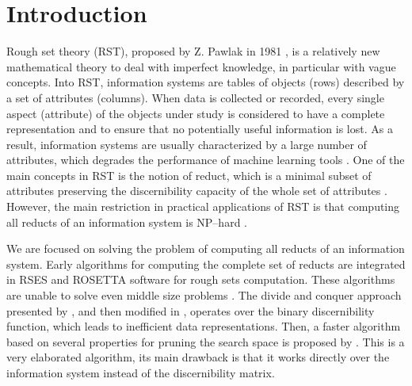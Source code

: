 \documentclass[authoryear,preprint,review,12pt]{elsarticle}
\begin{document}
\section{Introduction}
  Rough set theory (RST), proposed by Z. Pawlak in 1981 \citep{Pawlak81,Pawlak81-2,Pawlak82,Pawlak91}, 
  is a relatively new mathematical theory to deal with imperfect knowledge, in particular with vague 
  concepts. Into RST, information systems are tables of objects (rows) described by a set of attributes (columns). 
  When data is collected or recorded, every single aspect (attribute) of the objects under study is considered 
  to have a complete representation and to ensure that no potentially useful information is lost.
  As a result, information systems are usually characterized by a large number of attributes,
  which degrades the performance of machine learning tools \citep{Parthalain08}.
  One of the main concepts in RST is the notion of reduct, which is a minimal subset of attributes 
  preserving the discernibility capacity of the whole set of attributes \citep{Pawlak91}.  
  However, the main restriction in practical applications of RST is that computing all reducts of an 
  information system is NP--hard \citep{Skowron92}. 
  
  We are focused on solving the problem of computing all reducts of an information system. Early algorithms for computing the complete set of reducts \citep{Bazan2001,Ohrn00} are integrated in RSES and ROSETTA software for rough sets computation. These algorithms are unable to solve even middle size problems \citep{Lazo15}. The divide and conquer approach presented by \cite{Starzyk99,Starzyk00}, and then modified in \citep{Jensen14}, operates over the binary discernibility function, which leads to inefficient data representations. Then, a faster algorithm based on several properties for pruning the search space is proposed by \cite{WangP07}. This is a very elaborated algorithm, its main drawback is that it works directly over the information system instead of the discernibility matrix.   
     	
\end{document}

